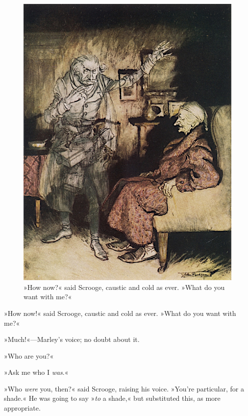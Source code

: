 \begin{figure}[p]
\begin{minipage}[c]{\textwidth}
\includegraphics[width=\textwidth]{scroogemarley2}
\caption[\textbf{»What do you want with me?«}]{»How now?« said Scrooge, caustic and cold as ever. »What do you want with me?«}
\end{minipage}
\end{figure}


»How now!« said Scrooge, caustic and cold as ever. »What do you want with me?«

»Much!«—Marley's voice; no doubt about it.

»Who are you?«

»Ask me who I \textit{was}.«

»Who \textit{were} you, then?« said Scrooge, raising his voice. »You're particular, for a shade.« He was going to say »\textit{to} a shade,« but substituted this, as more appropriate.

